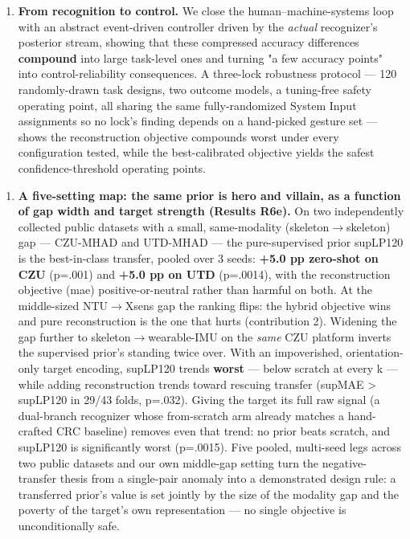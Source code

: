 \begin{enumerate}
  \item \textbf{From recognition to control.} We close the human--machine-systems loop with an abstract event-driven controller driven by the \textit{actual} recognizer's posterior stream, showing that these compressed accuracy differences \textbf{compound} into large task-level ones and turning "a few accuracy points" into control-reliability consequences. A three-lock robustness protocol --- 120 randomly-drawn task designs, two outcome models, a tuning-free safety operating point, all sharing the same fully-randomized System Input assignments so no lock's finding depends on a hand-picked gesture set --- shows the reconstruction objective compounds worst under every configuration tested, while the best-calibrated objective yields the safest confidence-threshold operating points.
\end{enumerate}

\begin{enumerate}
  \item \textbf{A five-setting map: the same prior is hero and villain, as a function of gap width and target strength (Results R6e).} On two independently collected public datasets with a small, same-modality (skeleton$\rightarrow$skeleton) gap --- CZU-MHAD and UTD-MHAD --- the pure-supervised prior supLP120 is the best-in-class transfer, pooled over 3 seeds: \textbf{+5.0 pp zero-shot on CZU} (p=.001) and \textbf{+5.0 pp on UTD} (p=.0014), with the reconstruction objective (mae) positive-or-neutral rather than harmful on both. At the middle-sized NTU$\rightarrow$Xsens gap the ranking flips: the hybrid objective wins and pure reconstruction is the one that hurts (contribution 2). Widening the gap further to skeleton$\rightarrow$wearable-IMU on the \textit{same} CZU platform inverts the supervised prior's standing twice over. With an impoverished, orientation-only target encoding, supLP120 trends \textbf{worst} --- below scratch at every k --- while adding reconstruction trends toward rescuing transfer (supMAE > supLP120 in 29/43 folds, p=.032). Giving the target its full raw signal (a dual-branch recognizer whose from-scratch arm already matches a hand-crafted CRC baseline) removes even that trend: no prior beats scratch, and supLP120 is significantly worst (p=.0015). Five pooled, multi-seed legs across two public datasets and our own middle-gap setting turn the negative-transfer thesis from a single-pair anomaly into a demonstrated design rule: a transferred prior's value is set jointly by the size of the modality gap and the poverty of the target's own representation --- no single objective is unconditionally safe.
\end{enumerate}

